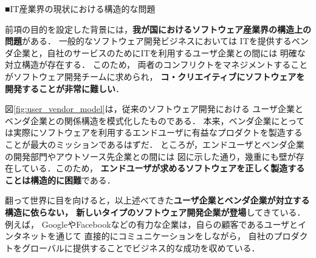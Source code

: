 \documentclass[11pt,a4paper,twoside]{jarticle}
\newcommand{\研究種別}{C}	%
\newcommand{\研究課題名}{コ・クリエイティブなソフトウェア開発者を育成するPBL型教育}
\newcommand{\研究機関名}{産業技術大学院大学}
\newcommand{\研究代表者氏名}{中鉢　欣秀}
\newcommand{\研究代表者氏名ふりがな}{ちゅうばち　よしひで}
\newcommand{\本応募effort}{\KLEffort{18}}	%
\newcommand{\研究期間の最終元号年度}{27}	%
\begin{document}
{	\begin{flushleft}
		■IT産業界の現状における構造的な問題
	\end{flushleft}

    前項の目的を設定した背景には，{\bf 我が国におけるソフトウェア産業界の構造上の問題}がある．
	一般的なソフトウェア開発ビジネスにおいては    
    ITを提供するベンダ企業と，自社のサービスのためにITを利用するユーザ企業との間には
    明確な対立構造が存在する．
    このため，
    両者のコンフリクトをマネジメントすることがソフトウェア開発チームに求められ，
    {\bf コ・クリエイティブにソフトウェアを開発することが非常に難しい}．
    
    図\ref{fig:user_vendor_model}は，従来のソフトウェア開発における
    ユーザ企業とベンダ企業との関係構造を模式化したものである．
    本来，ベンダ企業にとっては実際にソフトウェアを利用するエンドユーザに有益なプロダクトを製造する
    ことが最大のミッションであるはずだ．
    ところが，エンドユーザとベンダ企業の開発部門やアウトソース先企業との間には
    図に示した通り，幾重にも壁が存在している．このため，
    {\bf エンドユーザが求めるソフトウェアを正しく製造することは構造的に困難}である．
    
    
    
    

    翻って世界に目を向けると，以上述べてきた{\bf ユーザ企業とベンダ企業が対立する構造に依らない，
    新しいタイプのソフトウェア開発企業が登場}してきている．例えば，
    GoogleやFacebookなどの有力な企業は，自らの顧客であるユーザとインタネットを通じて
    直接的にコミュニケーションをしながら，
    自社のプロダクトをグローバルに提供することでビジネス的な成功を収めている．
    
}
\end{document}
